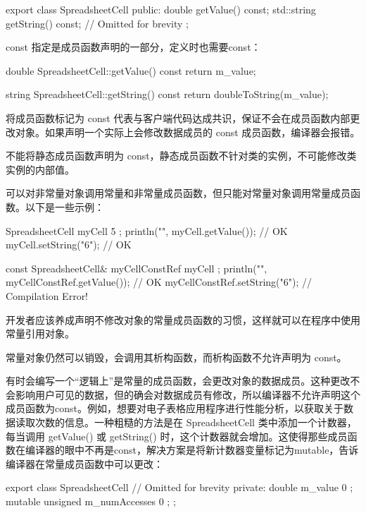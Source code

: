 \begin{cpp}
export class SpreadsheetCell
{
    public:
        double getValue() const;
        std::string getString() const;
        // Omitted for brevity
};
\end{cpp}

const 指定是成员函数声明的一部分，定义时也需要const：

\begin{cpp}
double SpreadsheetCell::getValue() const
{
    return m_value;
}

string SpreadsheetCell::getString() const
{
    return doubleToString(m_value);
}
\end{cpp}

将成员函数标记为 const 代表与客户端代码达成共识，保证不会在成员函数内部更改对象。如果声明一个实际上会修改数据成员的 const 成员函数，编译器会报错。

不能将静态成员函数声明为 const，静态成员函数不针对类的实例，不可能修改类实例的内部值。

可以对非常量对象调用常量和非常量成员函数，但只能对常量对象调用常量成员函数。以下是一些示例：

\begin{cpp}
SpreadsheetCell myCell { 5 };
println("{}", myCell.getValue()); // OK
myCell.setString("6"); // OK

const SpreadsheetCell& myCellConstRef { myCell };
println("{}", myCellConstRef.getValue()); // OK
myCellConstRef.setString("6"); // Compilation Error!
\end{cpp}

开发者应该养成声明不修改对象的常量成员函数的习惯，这样就可以在程序中使用常量引用对象。

常量对象仍然可以销毁，会调用其析构函数，而析构函数不允许声明为 const。


有时会编写一个“逻辑上”是常量的成员函数，会更改对象的数据成员。这种更改不会影响用户可见的数据，但的确会对数据成员有修改，所以编译器不允许声明这个成员函数为const。例如，想要对电子表格应用程序进行性能分析，以获取关于数据读取次数的信息。一种粗糙的方法是在 SpreadsheetCell 类中添加一个计数器，每当调用 getValue() 或 getString() 时，这个计数器就会增加。这使得那些成员函数在编译器的眼中不再是const，解决方案是将新计数器变量标记为mutable，告诉编译器在常量成员函数中可以更改：

\begin{cpp}
export class SpreadsheetCell
{
    // Omitted for brevity
    private:
        double m_value { 0 };
        mutable unsigned m_numAccesses { 0 };
};
\end{cpp}

